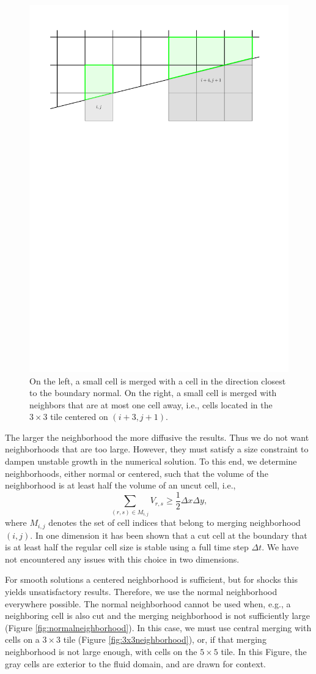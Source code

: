 \begin{figure}[h]
    \centering
    \includegraphics[width=0.5\linewidth]{figs/neighborhoods.pdf}
    \caption{\sf On the left, a small cell is merged with a cell in the direction closest to the 
    	boundary normal.  On the right, a small cell is merged with neighbors that are at most one cell away, i.e., cells located in the $3\times3$ tile centered on $(i+3,j+1)$.}
    \label{fig:neighborhoods}
\end{figure}

The larger the neighborhood the more diffusive the results. Thus we do not want neighborhoods that 
are too large.  However, they must satisfy a size constraint to dampen unstable growth in the numerical 
solution. To this end, we determine neighborhoods, either normal or centered, such that the
volume of the neighborhood is at least half the volume  of an uncut cell, i.e., 
\begin{equation} \label{eqn:vmerge}
\sum_{(r,s) \in M_{i,j}} V_{r,s} \geq \frac{1}{2}\Delta x \Delta y,
\end{equation}
where $M_{i,j}$ denotes the set of cell indices that belong to 
merging neighborhood $(i,j)$.    
In one dimension it has been shown \cite{mjb:stability2} that a cut cell at the boundary 
that is at least half the regular cell size  is stable using a full time step $\Delta t$.  
We have not encountered any issues with this choice in two dimensions.

For smooth solutions a centered neighborhood is sufficient, but for shocks this yields unsatisfactory results. Therefore, we use the normal neighborhood everywhere possible.
The normal neighborhood cannot be used when, e.g., a neighboring cell is also cut and the
merging neighborhood is not sufficiently large (Figure \ref{fig:normalneighborhood}).  In this case, we must use central merging with cells on a $3\times3$ tile (Figure \ref{fig:3x3neighborhood}), or, if that merging neighborhood is not large enough, with cells on the $5 \times 5$ tile.
In this Figure, the gray cells are exterior to the fluid domain, and
are drawn for context.



